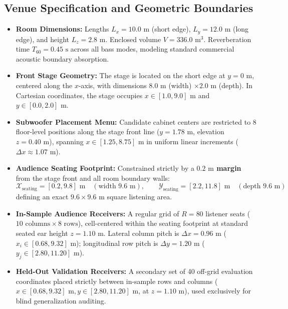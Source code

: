 \documentclass[11pt,a4paper]{article}
\begin{document}
\subsection{Venue Specification and Geometric Boundaries}
\begin{itemize}
    \item \textbf{Room Dimensions:} Lengths $L_x = 10.0\text{ m}$ (short edge), $L_y = 12.0\text{ m}$ (long edge), and height $L_z = 2.8\text{ m}$. Enclosed volume $V = 336.0\text{ m}^3$. Reverberation time $T_{60} = 0.45\text{ s}$ across all bass modes, modeling standard commercial acoustic boundary absorption.
    \item \textbf{Front Stage Geometry:} The stage is located on the short edge at $y = 0\text{ m}$, centered along the $x$-axis, with dimensions $8.0\text{ m}$ (width) $\times 2.0\text{ m}$ (depth). In Cartesian coordinates, the stage occupies $x \in [1.0, 9.0]\text{ m}$ and $y \in [0.0, 2.0]\text{ m}$.
    \item \textbf{Subwoofer Placement Menu:} Candidate cabinet centers are restricted to 8 floor-level positions along the stage front line ($y = 1.78\text{ m}$, elevation $z = 0.40\text{ m}$), spanning $x \in [1.25, 8.75]\text{ m}$ in uniform linear increments ($\Delta x \approx 1.07\text{ m}$).
    \item \textbf{Audience Seating Footprint:} Constrained strictly by a \textbf{$0.2\text{ m}$ margin} from the stage front and all room boundary walls:
    \begin{equation}
        \mathcal{X}_{\text{seating}} = [0.2, 9.8]\text{ m} \quad (\text{width } 9.6\text{ m}), \qquad \mathcal{Y}_{\text{seating}} = [2.2, 11.8]\text{ m} \quad (\text{depth } 9.6\text{ m})
    \end{equation}
    defining an exact $9.6 \times 9.6\text{ m}$ square listening area.
    \item \textbf{In-Sample Audience Receivers:} A regular grid of $R = 80$ listener seats ($10\text{ columns} \times 8\text{ rows}$), cell-centered within the seating footprint at standard seated ear height $z = 1.10\text{ m}$. Lateral column pitch is $\Delta x = 0.96\text{ m}$ ($x_i \in [0.68, 9.32]\text{ m}$); longitudinal row pitch is $\Delta y = 1.20\text{ m}$ ($y_j \in [2.80, 11.20]\text{ m}$).
    \item \textbf{Held-Out Validation Receivers:} A secondary set of 40 off-grid evaluation coordinates placed strictly between in-sample rows and columns ($x \in [0.68, 9.32]\text{ m}, y \in [2.80, 11.20]\text{ m}$, at $z = 1.10\text{ m}$), used exclusively for blind generalization auditing.
\end{itemize}
\end{document}
